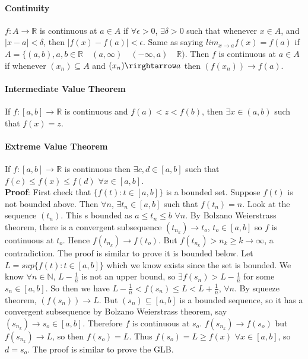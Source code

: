 \documentclass[10pt,letter]{article}
\begin{document}
\paragraph*{Continuity}
$f:A\rightarrow\mathbb{R}$ is continuous at $a\in A$ if $\forall\epsilon>0$, $\exists\delta>0$ such that whenever $x\in A$, and $|x-a|<\delta$, then $|f(x)-f(a)|<\epsilon$. Same as saying $lim_{x\rightarrow a}f(x) = f(a)$ if $A=\{(a,b), a,b\in\mathbb{R} \quad (a,\infty)\quad  (-\infty,a)\quad \mathbb{R})$. Then $f$ is continuous at $a\in A$ if whenever $(x_n)\subseteq A$  and $(x_n)\rirghtarrow a$ then $(f(x_n))\rightarrow f(a)$. 

\paragraph*{Intermediate Value Theorem}
If $f:[a,b]\rightarrow\mathbb{R}$ is continuous and $f(a)<z<f(b)$, then $\exists x\in(a,b)$ such that $f(x)=z$. 

\paragraph*{Extreme Value Theorem}
If $f:[a,b]\rightarrow\mathbb{R}$ is continuous then $\exists c,d \in [a,b]$ such that $f(c)\leq f(x)\leq f(d)$ $\forall x\in[a,b]$. \\ 
\textbf{Proof}: First check that $\{f(t):t\in[a,b]\}$ is a bounded set. Suppose $f(t)$ is not bounded above. Then $\forall n$, $\exists t_n\in[a,b]$ such that $f(t_n)=n$. Look at the sequence $(t_n)$. This s bounded as $a\leq t_n\leq b$ $\forall n$. By Bolzano Weierstrass theorem, there is a convergent subsequence $(t_{n_k})\rightarrow t_o$, $t_o\in[a,b]$ so $f$ is continuous at $t_o$. Hence $f(t_{n_k})\rightarrow f(t_o)$. But $f(t_{n_k})>n_k\geq k \rightarrow\infty$, a contradiction. The proof is similar to prove it is bounded below. 
Let $L = sup\{f(t):t\in[a,b]\}$ which we know exists since the set is bounded. We know $\forall n\in\mathbb{N}$, $L-\frac{1}{n}$ is not an upper bound, so $\exists f(s_n)>L-\frac{1}{n}$ for some $s_n\in[a,b]$. So then we have $L-\frac{1}{n}<f(s_n)\leq L < L + \frac{1}{n}$, $\forall n$. By squeeze theorem, $(f(s_n))\rightarrow L$. But $(s_n)\subseteq[a,b]$ is a bounded sequence, so it has a convergent subsequence by Bolzano Weierstrass theorem, say $(s_{n_k})\rightarrow s_o\in[a,b]$. Therefore $f$ is continuous at $s_o$. $f(s_{n_k})\rightarrow f(s_o)$ but $f(s_{n_k})\rightarrow L$, so then $f(s_o)=L$. Thus $f(s_o)=L\geq f(x)$ $\forall x\in[a,b]$, so $d = s_o$. The proof is similar to prove the GLB. 
\end{document}
